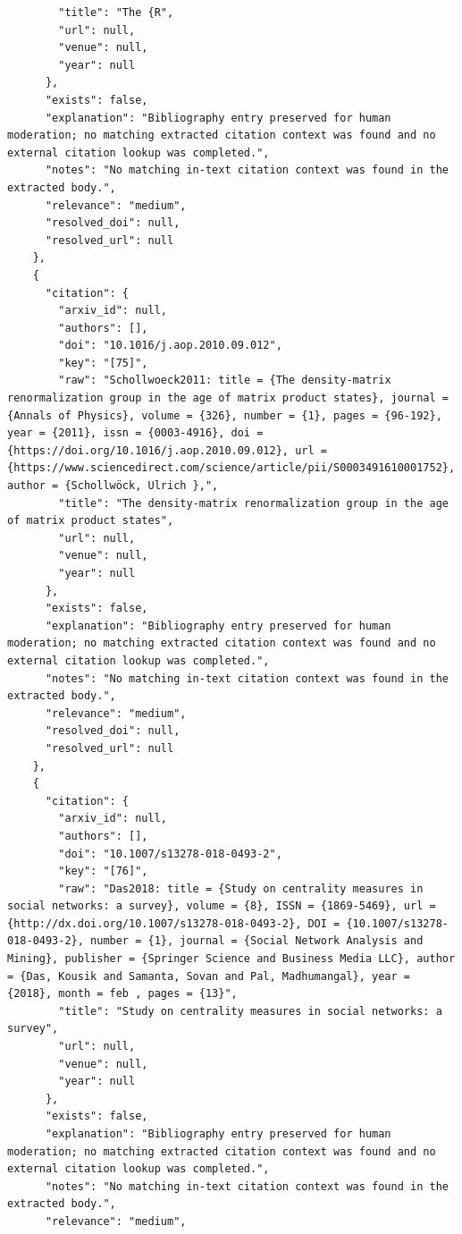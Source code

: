 \documentclass[11pt]{article}
\begin{document}
\begin{verbatim}
        "title": "The {R",
        "url": null,
        "venue": null,
        "year": null
      },
      "exists": false,
      "explanation": "Bibliography entry preserved for human moderation; no matching extracted citation context was found and no external citation lookup was completed.",
      "notes": "No matching in-text citation context was found in the extracted body.",
      "relevance": "medium",
      "resolved_doi": null,
      "resolved_url": null
    },
    {
      "citation": {
        "arxiv_id": null,
        "authors": [],
        "doi": "10.1016/j.aop.2010.09.012",
        "key": "[75]",
        "raw": "Schollwoeck2011: title = {The density-matrix renormalization group in the age of matrix product states}, journal = {Annals of Physics}, volume = {326}, number = {1}, pages = {96-192}, year = {2011}, issn = {0003-4916}, doi = {https://doi.org/10.1016/j.aop.2010.09.012}, url = {https://www.sciencedirect.com/science/article/pii/S0003491610001752}, author = {Schollwöck, Ulrich },",
        "title": "The density-matrix renormalization group in the age of matrix product states",
        "url": null,
        "venue": null,
        "year": null
      },
      "exists": false,
      "explanation": "Bibliography entry preserved for human moderation; no matching extracted citation context was found and no external citation lookup was completed.",
      "notes": "No matching in-text citation context was found in the extracted body.",
      "relevance": "medium",
      "resolved_doi": null,
      "resolved_url": null
    },
    {
      "citation": {
        "arxiv_id": null,
        "authors": [],
        "doi": "10.1007/s13278-018-0493-2",
        "key": "[76]",
        "raw": "Das2018: title = {Study on centrality measures in social networks: a survey}, volume = {8}, ISSN = {1869-5469}, url = {http://dx.doi.org/10.1007/s13278-018-0493-2}, DOI = {10.1007/s13278-018-0493-2}, number = {1}, journal = {Social Network Analysis and Mining}, publisher = {Springer Science and Business Media LLC}, author = {Das, Kousik and Samanta, Sovan and Pal, Madhumangal}, year = {2018}, month = feb , pages = {13}",
        "title": "Study on centrality measures in social networks: a survey",
        "url": null,
        "venue": null,
        "year": null
      },
      "exists": false,
      "explanation": "Bibliography entry preserved for human moderation; no matching extracted citation context was found and no external citation lookup was completed.",
      "notes": "No matching in-text citation context was found in the extracted body.",
      "relevance": "medium",

\end{verbatim}
\end{document}
